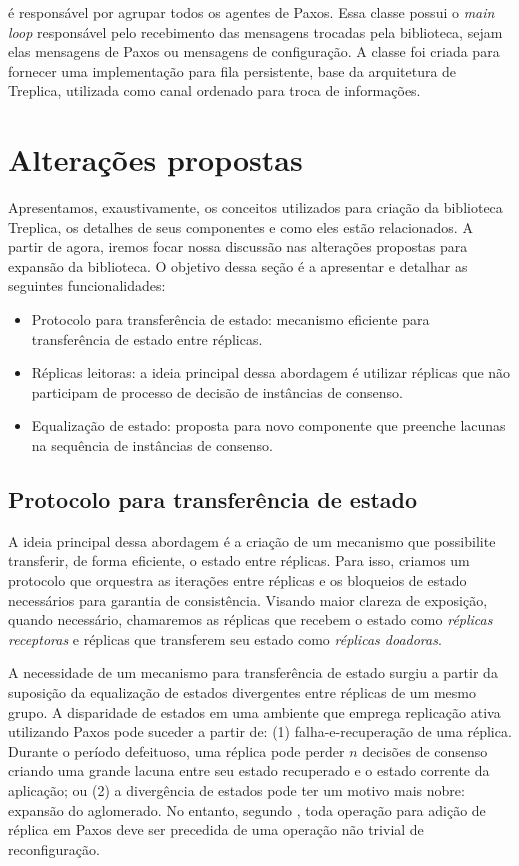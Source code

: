  é responsável por agrupar todos os agentes de Paxos.
Essa classe possui o \emph{main loop} responsável pelo recebimento das mensagens trocadas
pela biblioteca, sejam elas mensagens de Paxos ou mensagens de configuração. A classe
 foi criada para fornecer uma implementação para fila
persistente, base da arquitetura de Treplica, utilizada como canal ordenado para troca de
informações.


\section{Alterações propostas}\label{sec:alteracoes_propostas}

Apresentamos, exaustivamente, os conceitos utilizados para criação da biblioteca Treplica,
os detalhes de seus componentes e como eles estão relacionados. A partir de agora, iremos
focar nossa discussão nas alterações propostas para expansão da biblioteca. O objetivo
dessa seção é a apresentar e detalhar as seguintes funcionalidades:

\begin{itemize}
  \item Protocolo para transferência de estado: mecanismo eficiente para transferência de
    estado entre réplicas.
  \item Réplicas leitoras: a ideia principal dessa abordagem é utilizar réplicas que não
    participam de processo de decisão de instâncias de consenso.
  \item Equalização de estado: proposta para novo componente que preenche lacunas na
    sequência de instâncias de consenso.
\end{itemize}

\subsection{Protocolo para transferência de estado}

A ideia principal dessa abordagem é a criação de um mecanismo que possibilite transferir, de
forma eficiente, o estado entre réplicas. Para isso, criamos um protocolo que orquestra as
iterações entre réplicas e os bloqueios de estado necessários para garantia de
consistência. Visando maior clareza de exposição, quando necessário, chamaremos as
réplicas que recebem o estado como \emph{réplicas receptoras} e réplicas que transferem
seu estado como \emph{réplicas doadoras}.

A necessidade de um mecanismo para transferência de estado surgiu a partir da suposição da
equalização de estados divergentes entre réplicas de um mesmo grupo. A disparidade de
estados em uma ambiente que emprega replicação ativa utilizando Paxos pode suceder a
partir de: (1) falha-e-recuperação de uma réplica. Durante o período defeituoso, uma
réplica pode perder $n$ decisões de consenso criando uma grande lacuna entre seu estado
recuperado e o estado corrente da aplicação; ou (2) a divergência de estados pode ter um
motivo mais nobre: expansão do aglomerado. No entanto, segundo ,
toda operação para adição de réplica em Paxos deve ser precedida de uma operação não
trivial de reconfiguração.

